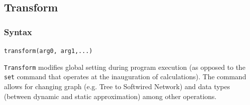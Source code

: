 \subsection{Transform}
	\label{subsec:Transform}
	\subsubsection{Syntax}
		\texttt{transform(arg0, arg1,...)}
			
	\begin{phygdescription}
		{\texttt{Transform} modifies global setting during program execution (as opposed to the \texttt{set} 
		command that operates at the inauguration of calculations). The command allows for changing 
		graph (e.g. Tree to Softwired Network) and data types (between dynamic and static approximation) 
		among other operations.}
	\end{phygdescription}
			
